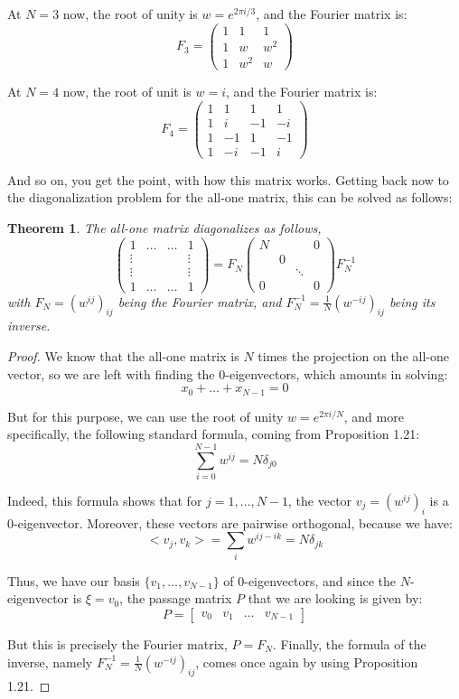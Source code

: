 \documentclass[12pt]{amsbook}
\newtheorem{theorem}{Theorem}[chapter]
\begin{document}
At $N=3$ now, the root of unity is $w=e^{2\pi i/3}$, and the Fourier matrix is:
$$F_3=\begin{pmatrix}1&1&1\\ 1&w&w^2\\ 1&w^2&w\end{pmatrix}$$

At $N=4$ now, the root of unit is $w=i$, and the Fourier matrix is:
$$F_4=\begin{pmatrix}
1&1&1&1\\
1&i&-1&-i\\
1&-1&1&-1\\
1&-i&-1&i
\end{pmatrix}$$

And so on, you get the point, with how this matrix works. Getting back now to the diagonalization problem for the all-one matrix, this can be solved as follows:


\begin{theorem}
The all-one matrix diagonalizes as follows,
$$\begin{pmatrix}
1&\ldots&\ldots&1\\
\vdots&&&\vdots\\
\vdots&&&\vdots\\
1&\ldots&\ldots&1\end{pmatrix}
=F_N
\begin{pmatrix}
N&&&0\\
&0\\
&&\ddots\\
0&&&0\end{pmatrix}F_N^{-1}$$
with $F_N=(w^{ij})_{ij}$ being the Fourier matrix, and $F_N^{-1}=\frac{1}{N}(w^{-ij})_{ij}$ being its inverse.
\end{theorem}

\begin{proof}
We know that the all-one matrix is $N$ times the projection on the all-one vector, so we are left with finding the 0-eigenvectors, which amounts in solving:
$$x_0+\ldots+x_{N-1}=0$$

But for this purpose, we can use the root of unity $w=e^{2\pi i/N}$, and more specifically, the following standard formula, coming from Proposition 1.21:
$$\sum_{i=0}^{N-1}w^{ij}=N\delta_{j0}$$

Indeed, this formula shows that for $j=1,\ldots,N-1$, the vector $v_j=(w^{ij})_i$ is a 0-eigenvector. Moreover, these vectors are pairwise orthogonal, because we have:
$$<v_j,v_k>
=\sum_iw^{ij-ik}
=N\delta_{jk}$$

Thus, we have our basis $\{v_1,\ldots,v_{N-1}\}$ of 0-eigenvectors, and since the $N$-eigenvector is $\xi=v_0$, the passage matrix $P$ that we are looking is given by:
$$P=\begin{bmatrix}v_0&v_1&\ldots&v_{N-1}\end{bmatrix}$$

But this is precisely the Fourier matrix, $P=F_N$. Finally, the formula of the inverse, namely $F_N^{-1}=\frac{1}{N}(w^{-ij})_{ij}$, comes once again by using Proposition 1.21.
\end{proof}
\end{document}
